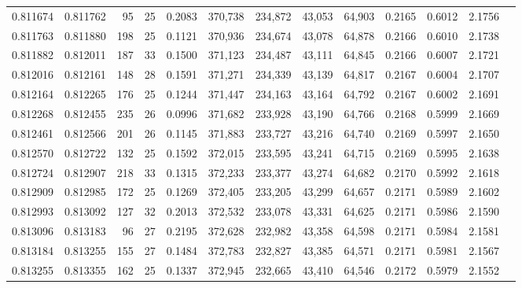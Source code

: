 \begin{tabular}{rrrrrrrrrrrrr}
0.811674 & 0.811762 &    95 &  25 &                                     0.2083 & 370,738 & 234,872 &  43,053 &  64,903 & 0.2165 & 0.6012 & 2.1756 \\
0.811763 & 0.811880 &   198 &  25 &                                     0.1121 & 370,936 & 234,674 &  43,078 &  64,878 & 0.2166 & 0.6010 & 2.1738 \\
0.811882 & 0.812011 &   187 &  33 &                                     0.1500 & 371,123 & 234,487 &  43,111 &  64,845 & 0.2166 & 0.6007 & 2.1721 \\
0.812016 & 0.812161 &   148 &  28 &                                     0.1591 & 371,271 & 234,339 &  43,139 &  64,817 & 0.2167 & 0.6004 & 2.1707 \\
0.812164 & 0.812265 &   176 &  25 &                                     0.1244 & 371,447 & 234,163 &  43,164 &  64,792 & 0.2167 & 0.6002 & 2.1691 \\
0.812268 & 0.812455 &   235 &  26 &                                     0.0996 & 371,682 & 233,928 &  43,190 &  64,766 & 0.2168 & 0.5999 & 2.1669 \\
0.812461 & 0.812566 &   201 &  26 &                                     0.1145 & 371,883 & 233,727 &  43,216 &  64,740 & 0.2169 & 0.5997 & 2.1650 \\
0.812570 & 0.812722 &   132 &  25 &                                     0.1592 & 372,015 & 233,595 &  43,241 &  64,715 & 0.2169 & 0.5995 & 2.1638 \\
0.812724 & 0.812907 &   218 &  33 &                                     0.1315 & 372,233 & 233,377 &  43,274 &  64,682 & 0.2170 & 0.5992 & 2.1618 \\
0.812909 & 0.812985 &   172 &  25 &                                     0.1269 & 372,405 & 233,205 &  43,299 &  64,657 & 0.2171 & 0.5989 & 2.1602 \\
0.812993 & 0.813092 &   127 &  32 &                                     0.2013 & 372,532 & 233,078 &  43,331 &  64,625 & 0.2171 & 0.5986 & 2.1590 \\
0.813096 & 0.813183 &    96 &  27 &                                     0.2195 & 372,628 & 232,982 &  43,358 &  64,598 & 0.2171 & 0.5984 & 2.1581 \\
0.813184 & 0.813255 &   155 &  27 &                                     0.1484 & 372,783 & 232,827 &  43,385 &  64,571 & 0.2171 & 0.5981 & 2.1567 \\
0.813255 & 0.813355 &   162 &  25 &                                     0.1337 & 372,945 & 232,665 &  43,410 &  64,546 & 0.2172 & 0.5979 & 2.1552 \\

\end{tabular}
